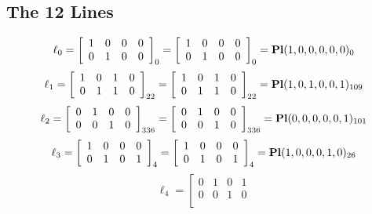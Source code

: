 \documentclass{article}
\begin{document}
{\subsection*{The 12 Lines}
$$
\ell_{0} = 
\left[
\begin{array}{*{4}{r}}
1 & 0 & 0 & 0\\
0 & 1 & 0 & 0\\
\end{array}
\right]
_{0}
=
\left[
\begin{array}{*{4}c}
1  & 0  & 0  & 0\\
0  & 1  & 0  & 0\\
\end{array}
\right]_{0}
={\rm\bf Pl}(1,0,0,0,0,0 )_{0}$$
$$
\ell_{1} = 
\left[
\begin{array}{*{4}{r}}
1 & 0 & 1 & 0\\
0 & 1 & 1 & 0\\
\end{array}
\right]
_{22}
=
\left[
\begin{array}{*{4}c}
1  & 0  & 1  & 0\\
0  & 1  & 1  & 0\\
\end{array}
\right]_{22}
={\rm\bf Pl}(1,0,1,0,0,1 )_{109}$$
$$
\ell_{2} = 
\left[
\begin{array}{*{4}{r}}
0 & 1 & 0 & 0\\
0 & 0 & 1 & 0\\
\end{array}
\right]
_{336}
=
\left[
\begin{array}{*{4}c}
0  & 1  & 0  & 0\\
0  & 0  & 1  & 0\\
\end{array}
\right]_{336}
={\rm\bf Pl}(0,0,0,0,0,1 )_{101}$$
$$
\ell_{3} = 
\left[
\begin{array}{*{4}{r}}
1 & 0 & 0 & 0\\
0 & 1 & 0 & 1\\
\end{array}
\right]
_{4}
=
\left[
\begin{array}{*{4}c}
1  & 0  & 0  & 0\\
0  & 1  & 0  & 1\\
\end{array}
\right]_{4}
={\rm\bf Pl}(1,0,0,0,1,0 )_{26}$$
$$
\ell_{4} = 
\left[
\begin{array}{*{4}{r}}
0 & 1 & 0 & 1\\
0 & 0 & 1 & 0\\
\end{array}
$$}
\end{document}
